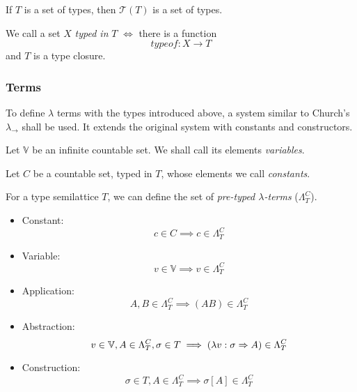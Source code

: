 \documentclass[main.tex]{subfiles}
\begin{document}
\begin{prop}
    If $T$ is a set of types, then $\mathcal{T}(T)$ is a set of types.
\end{prop}

\begin{defn}
    We call a set $X$ \emph{typed in} $T$ $\iff$ there is a function
    \[ typeof : X \rightarrow T \] and $T$ is a type closure.
\end{defn}

\subsubsection{Terms}
To define $\lambda$ terms with the types introduced above, a system similar
to Church's $\lambda_\rightarrow$ \cite[chap.~2.4]{ttfp} shall be used. It
extends the original system with constants and constructors.

\begin{defn}
    Let $\mathbb{V}$ be an infinite countable set. We shall call its elements
    \emph{variables}.
\end{defn}

\begin{defn}
    Let $C$ be a countable set, typed in $T$,
    whose elements we call \emph{constants}.

    For a type semilattice $T$, we can define the set of
    \emph{pre-typed $\lambda$-terms} ($\Lambda_T^C$).

    \begin{itemize}
        \item Constant:    \[ c \in C \implies c \in \Lambda_T^C \]
        \item Variable:    \[ v \in \mathbb{V} \implies v \in \Lambda_T^C \]
        \item Application: \[ A, B \in \Lambda_T^C \implies (AB) \in \Lambda_T^C \]
        \item Abstraction: \[ v \in \mathbb{V}, A \in \Lambda_T^C, \sigma \in T
                \implies (\lambda v : \sigma \Rightarrow A) \in \Lambda_T^C \]
        \item Construction: \[ \sigma \in T, A \in \Lambda_T^C
                \implies \sigma[A] \in \Lambda_T^C \]
    \end{itemize}
\end{defn}
\end{document}
